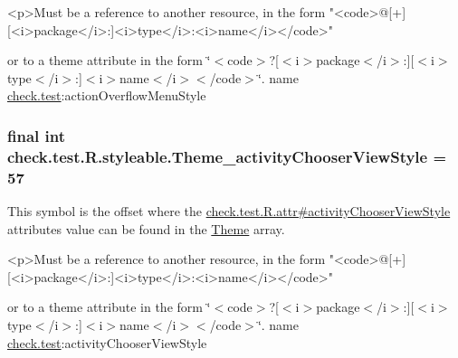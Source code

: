 \begin{DoxyVerb}      <p>Must be a reference to another resource, in the form "<code>@[+][<i>package</i>:]<i>type</i>:<i>name</i></code>"
\end{DoxyVerb}
 or to a theme attribute in the form \char`\"{}$<$code$>$?\mbox{[}$<$i$>$package$<$/i$>$\+:\mbox{]}\mbox{[}$<$i$>$type$<$/i$>$\+:\mbox{]}$<$i$>$name$<$/i$>$$<$/code$>$\char`\"{}.  name \hyperlink{namespacecheck_1_1test}{check.\+test}\+:action\+Overflow\+Menu\+Style \hypertarget{classcheck_1_1test_1_1_r_1_1styleable_a5df6cc2d9245f0001ee13f7cb5b95869}{}
\subsubsection[{Theme\+\_\+activity\+Chooser\+View\+Style}]{\setlength{\rightskip}{0pt plus 5cm}final int check.\+test.\+R.\+styleable.\+Theme\+\_\+activity\+Chooser\+View\+Style = 57\hspace{0.3cm}{\ttfamily [static]}}\label{classcheck_1_1test_1_1_r_1_1styleable_a5df6cc2d9245f0001ee13f7cb5b95869}
This symbol is the offset where the \hyperlink{classcheck_1_1test_1_1_r_1_1attr_a112293f577f9e7451b663966a7cabb2b}{check.\+test.\+R.\+attr\#activity\+Chooser\+View\+Style} attribute\textquotesingle{}s value can be found in the \hyperlink{classcheck_1_1test_1_1_r_1_1styleable_acca726d02016a0cf607782ec3a436a81}{Theme} array.

\begin{DoxyVerb}      <p>Must be a reference to another resource, in the form "<code>@[+][<i>package</i>:]<i>type</i>:<i>name</i></code>"
\end{DoxyVerb}
 or to a theme attribute in the form \char`\"{}$<$code$>$?\mbox{[}$<$i$>$package$<$/i$>$\+:\mbox{]}\mbox{[}$<$i$>$type$<$/i$>$\+:\mbox{]}$<$i$>$name$<$/i$>$$<$/code$>$\char`\"{}.  name \hyperlink{namespacecheck_1_1test}{check.\+test}\+:activity\+Chooser\+View\+Style \hypertarget{classcheck_1_1test_1_1_r_1_1styleable_acba96b3fbc00ef03937429054fbe3036}{}
